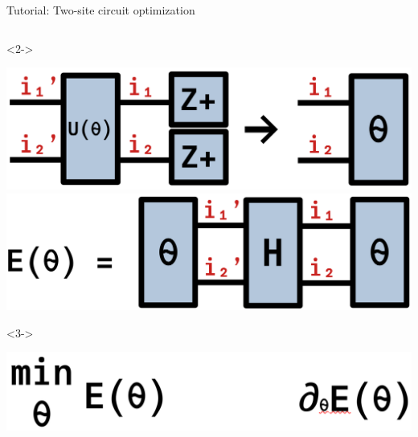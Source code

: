 \begin{frame}[fragile]{Tutorial: Two-site circuit optimization}
\begin{columns}
\begin{column}{5cm}
\begin{onlyenv}<2->
\vspace*{0.0cm}
\begin{center}
\includegraphics[width=1.0\textwidth]{
  slides/assets/UZp1Zp2.png
} \\
\includegraphics[width=1.0\textwidth]{
  slides/assets/theta12Htheta12.png
}
\end{center}
\vspace*{0.0cm}
\end{onlyenv}

\begin{onlyenv}<3->
\vspace*{0.0cm}
\begin{center}
\includegraphics[width=1.0\textwidth]{
  slides/assets/min_grad_E_theta.png
}
\end{center}
\vspace*{0.0cm}
\end{onlyenv}

\end{column}

\end{columns}

\end{frame}

